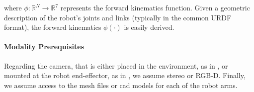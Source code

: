 where $\phi: \mathbb{R}^N\rightarrow\mathbb{R}^{7}$ represents the forward kinematics function. Given a geometric description of the robot's joints and links (typically in the common URDF format), the forward kinematics $\phi(\cdot)$ is easily derived.

\paragraph{Modality Prerequisites} Regarding the camera, that is either placed in the environment, as in , or mounted at the robot end-effector, as in , we assume stereo or RGB-D. Finally, we assume access to the mesh files or \acrshort{cad} models for each of the robot arms.







